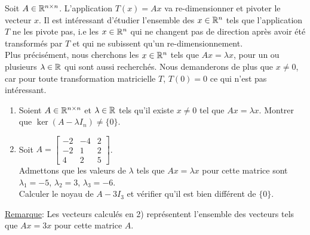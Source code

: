 \begin{exercice}
\noindent Soit $A \in \mathbb{R}^{n \times n}$. L'application $T(x)=Ax$ va re-dimensionner et pivoter le vecteur $x$. Il est intéressant d'étudier l'ensemble des $x \in \mathbb{R}^n$ tels que l'application $T$ ne les pivote pas, i.e les $x \in \mathbb{R}^n$ qui ne changent pas de direction après avoir été transformés par $T$ et qui ne subissent qu'un re-dimensionnement. \\
Plus précisément, nous cherchons les $x \in \mathbb{R}^n$ tels que $Ax=\lambda x$, pour un ou plusieurs $\lambda \in \mathbb{R}$ qui sont aussi recherchés. Nous demanderons de plus que $x \neq 0$, car pour toute transformation matricielle $T$, $T(0)=0$ ce qui n'est pas intéressant.
\begin{enumerate}
    \item Soient $A \in \mathbb{R}^{n \times n}$ et $\lambda \in \mathbb{R}$ tels qu'il existe $x \neq 0$ tel que $Ax = \lambda x$. Montrer que $\ker (A-\lambda I_n) \neq \{0\}$.
    \item Soit $A= \begin{bmatrix} -2 & -4 & 2 \\ -2 & 1 & 2 \\ 4 & 2 & 5 \end{bmatrix}$. \\
    Admettons que les valeurs de $\lambda$ tels que $Ax=\lambda x$ pour cette matrice sont $\lambda_1 = -5$, $\lambda_2 = 3$, $\lambda_3 = -6$. \\
    Calculer le noyau de $A-3 I_3$ et vérifier qu'il est bien différent de $\{0\}$.
\end{enumerate}
\underline{Remarque}: Les vecteurs calculés en 2) représentent l'ensemble des vecteurs tels que $Ax=3x$ pour cette matrice $A$. \\
\end{exercice}

